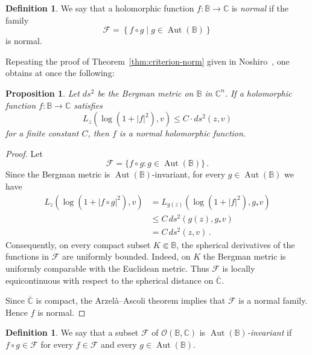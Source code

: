 \documentclass[pdflatex]{sn-jnl}%
\newtheorem{prop}[thm]{Proposition}
\theoremstyle{definition}
\newtheorem{defn}[thm]{Definition}
\theoremstyle{remark}
\numberwithin{equation}{section}
\newcommand{\set}[1]{\left\{#1\right\}}
\newcommand{\C}{\mathbb{C}}
\begin{document}
    \begin{defn}
        \label{defn:norm-manif-1}
        We say that a holomorphic function $f: \mathbb{B}\rightarrow \C$ is \emph{normal} if the family
        \[
            {\mathcal{F}}= \set{f \circ g \mid g \in \operatorname{Aut}(\mathbb{B})}
        \]
        is normal.
    \end{defn}

    Repeating the proof of Theorem~\ref{thm:criterion-norm} given in Noshiro~\cite[p.~87]{MR0133464}, one obtains at once the following:

    \begin{prop}
        \label{prop:norm-manif-1}
        Let $ds^2$ be the Bergman metric on $\mathbb{B}$ in $\C^n$.
        If a holomorphic function $f: \mathbb{B}\rightarrow \C$ satisfies
        \[
            L_z(\log(1+|f|^2), v)\leq C\cdot ds^2(z,v)
        \]
        for a finite constant $C$, then $f$ is a normal holomorphic function.
    \end{prop}

    \begin{proof}
        Let
        \[
            \mathcal{F}=\{f\circ g:g\in\operatorname{Aut}(\mathbb{B})\}\,.
        \]
        Since the Bergman metric is $\operatorname{Aut}(\mathbb{B})$-invariant, for every $g\in\operatorname{Aut}(\mathbb{B})$ we have
        \[
            \begin{aligned}
                L_z\left(\log(1+|f\circ g|^2),v\right) & = L_{g(z)}\left(\log(1+|f|^2),g_{*}v\right) \\
                                                           & \leq C\,ds^2(g(z),g_{*}v)                   \\
                                                           & = C\,ds^2(z,v)\,.
            \end{aligned}
        \]
        Consequently, on every compact subset $K\Subset\mathbb{B}$, the spherical derivatives of the functions in $\mathcal{F}$ are uniformly bounded.
        Indeed, on $K$ the Bergman metric is uniformly comparable with the Euclidean metric.
        Thus $\mathcal{F}$ is locally equicontinuous with respect to the spherical distance on $\overline{\C}$.

        Since $\overline{\C}$ is compact, the Arzel\`{a}--Ascoli theorem implies that $\mathcal{F}$ is a normal family.
        Hence $f$ is normal.
    \end{proof}

    \begin{defn}
        \label{defn:norm-manif-2}
        We say that a subset ${\mathcal{F}}$ of ${\mathcal{O}}(\mathbb{B}, \C)$ is \emph{$\operatorname{Aut}(\mathbb{B})$-invariant} if $f \circ g \in{\mathcal{F}}$ for every $f \in{\mathcal{F}}$ and every $g \in \operatorname{Aut}(\mathbb{B})$.
    \end{defn}
\end{document}
